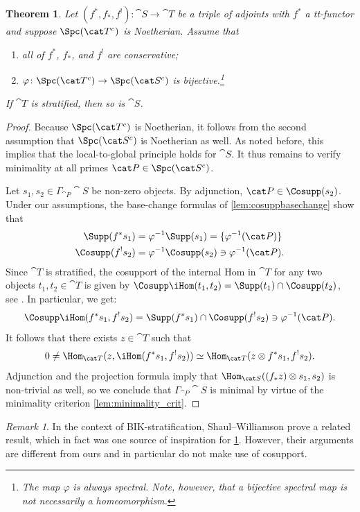 \documentclass{amsart}%
\numberwithin{equation}{section}%
\newtheorem{Thm}[equation]{Theorem}
\theoremstyle{remark}
\newtheorem{Rem}[equation]{Remark}
\newcounter{enum-resume-hack}
\begin{document}
\begin{Thm}\label{thm:nildescent}
Let $(f^*,f_*,f^!)\colon \cat S \to \cat T$ be a triple of adjoints with $f^*$ a tt-functor and suppose $\Spc(\cat T^c)$ is Noetherian. Assume that
    \begin{enumerate}
        \item all of $f^*$, $f_*$, and $f^!$ are conservative;
        \item $\varphi\colon \Spc(\cat T^c) \to \Spc(\cat S^c)$ is bijective.\footnote{The map $\varphi$ is always spectral. Note, however, that a bijective spectral map is not necessarily a homeomorphism.}
    \end{enumerate}
If $\cat T$ is stratified, then so is $\cat S$. 
\end{Thm}
\begin{proof}
Because $\Spc(\cat T^c)$ is Noetherian, it follows from the second assumption that $\Spc(\cat S^c)$ is Noetherian as well. As noted before, this implies that the local-to-global principle holds for $\cat S$. It thus remains to verify minimality at all primes $\cat P \in \Spc(\cat S^c)$.  

Let $s_1,s_2 \in \Gamma_{\cat P}\cat S$ be non-zero objects. By adjunction, $\cat P \in \Cosupp(s_2)$. Under our assumptions, the base-change formulas of \cref{lem:cosuppbasechange} show that 
\begin{align*}
    \Supp(f^*s_1) & = \varphi^{-1}\Supp(s_1) = \{\varphi^{-1}(\cat P)\} \\
    \Cosupp(f^!s_2) & = \varphi^{-1}\Cosupp(s_2) \ni \varphi^{-1}(\cat P).
\end{align*}
Since $\cat T$ is stratified, the cosupport of the internal Hom in $\cat T$ for any two objects $t_1,t_2 \in \cat T$ is given by $\Cosupp\iHom(t_1,t_2) = \Supp(t_1) \cap \Cosupp(t_2)$, see \cite[Thm.~4.1]{bchs1}. In particular, we get:
\[
\Cosupp\iHom(f^*s_1,f^!s_2) = \Supp(f^*s_1) \cap \Cosupp(f^!s_2) \ni \varphi^{-1}(\cat P).
\]
It follows that there exists $z \in \cat T$ such that 
\[
0 \neq \Hom_{\cat T}(z,\iHom(f^*s_1,f^!s_2)) \simeq \Hom_{\cat T}(z \otimes f^*s_1,f^!s_2).
\]
Adjunction and the projection formula imply that $\Hom_{\cat S}((f_*z) \otimes s_1,s_2)$ is non-trivial as well, so we conclude that $\Gamma_{\cat P}\cat S$ is minimal by virtue of the minimality criterion \cref{lem:minimality_crit}. 
\end{proof}

\begin{Rem}
In the context of BIK-stratification, Shaul--Williamson \cite{sw_descent} prove a related result, which in fact was one source of inspiration for \cref{thm:nildescent}. However, their arguments are different from ours and in particular do not make use of cosupport.
\end{Rem}
\end{document}
